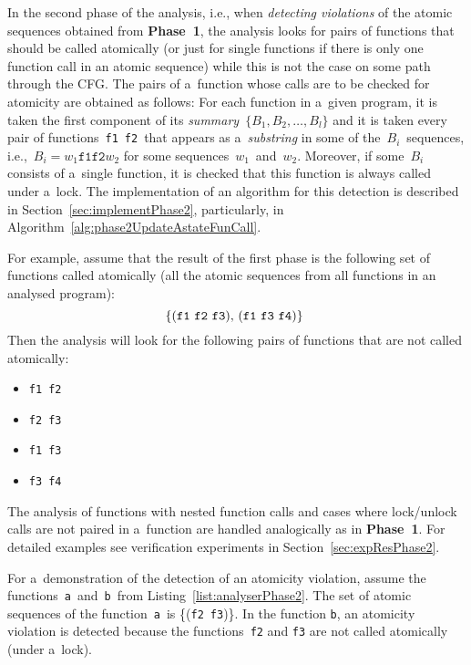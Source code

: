 In the second phase of the analysis, i.e., when \emph{detecting
violations} of the atomic sequences obtained from \textbf{Phase~1}, the 
analysis looks for pairs of functions that should be called atomically 
(or just for single functions if there is only one function call in an 
atomic sequence) while this is not the case on some path through the CFG.
The pairs of a~function whose calls are to be checked for atomicity are
obtained as follows: For each function in a~given program, it is taken
the first component of its \emph{summary}~$ \{B_1, B_2, \ldots, B_l\} $
and it is taken every pair of functions~\texttt{f1}~\texttt{f2}~that
appears as a~\emph{substring} in some of the~$ B_i $~sequences, 
i.e.,~$ B_i = w_1\mathtt{f1f2}w_2 $ for some sequences~$ w_1 $~and~$ w_2 $.
Moreover, if some~$ B_i $ consists of a~single function, it is checked
that this function is always called under a~lock. The implementation of 
an algorithm for this detection is described in
Section~\ref{sec:implementPhase2}, particularly, in
Algorithm~\ref{alg:phase2UpdateAstateFunCall}.

\begin{example}
    For example, assume that the result of the first phase is the following
    set of functions called atomically (all the atomic sequences from
    all functions in an analysed program):
    $$
        \text{%
            \{(\texttt{f1}~\texttt{f2}~\texttt{f3}),
            (\texttt{f1}~\texttt{f3}~\texttt{f4})\}
        }
    $$
    Then the analysis will look
    for the following pairs of functions that are not called atomically:
    \begin{itemize}
        \item \texttt{f1}~\texttt{f2}
        \item \texttt{f2}~\texttt{f3}
        \item \texttt{f1}~\texttt{f3}
        \item \texttt{f3}~\texttt{f4}
    \end{itemize}
\end{example}

The analysis of functions with nested function calls and cases where 
lock/unlock calls are not paired in a~function are handled analogically
as in \textbf{Phase~1}. For detailed examples see verification experiments 
in Section~\ref{sec:expResPhase2}.

\begin{example}
    For a~demonstration of the detection of an atomicity violation, assume
    the functions~\texttt{a}~and~\texttt{b}~from
    Listing~\ref{list:analyserPhase2}. The set of atomic sequences of the
    function~\texttt{a}~is \{(\texttt{f2}~\texttt{f3})\}. In the function
    \texttt{b}, an atomicity violation is detected because the
    functions~\texttt{f2} and \texttt{f3} are not called atomically (under
    a~lock).
\end{example}

